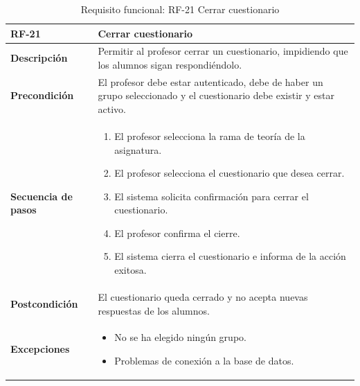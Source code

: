 \begin{table}[H]
\centering
\begin{tabularx}{\textwidth}{
  |>{\centering\arraybackslash}l
  |>{\centering\arraybackslash}X|}
\hline
\textbf{RF-21} & \textbf{Cerrar cuestionario} \\ \hline

\textbf{Descripción} & Permitir al profesor cerrar un cuestionario, impidiendo que los alumnos sigan respondiéndolo. \\ \hline

\textbf{Precondición} & El profesor debe estar autenticado, debe de haber un grupo seleccionado y el cuestionario debe existir y estar activo. \\ \hline

\textbf{Secuencia de pasos} & 
\begin{enumerate}
  \item El profesor selecciona la rama de teoría de la asignatura.
  \item El profesor selecciona el cuestionario que desea cerrar.
  \item El sistema solicita confirmación para cerrar el cuestionario.
  \item El profesor confirma el cierre.
  \item El sistema cierra el cuestionario e informa de la acción exitosa.
\end{enumerate} \\ \hline

\textbf{Postcondición} & El cuestionario queda cerrado y no acepta nuevas respuestas de los alumnos. \\ \hline

\textbf{Excepciones} & 
\begin{itemize}
  \item No se ha elegido ningún grupo.
  \item Problemas de conexión a la base de datos.
\end{itemize} \\ \hline
\end{tabularx}
\caption{Requisito funcional: RF-21 Cerrar cuestionario}
\end{table}


